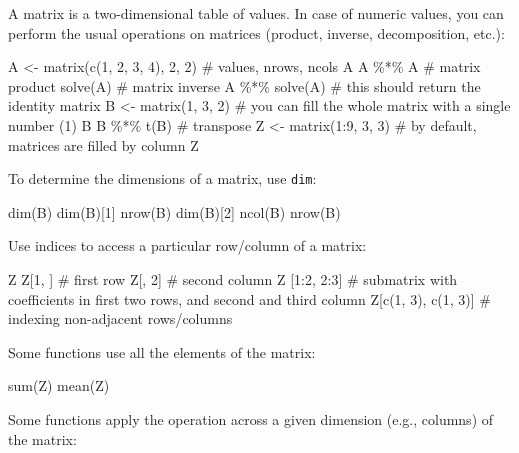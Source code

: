 \documentclass[
  letterpaper,
  DIV=11,
  numbers=noendperiod]{scrreprt}
\newenvironment{Shaded}{\begin{snugshade}}{\end{snugshade}}
\newcommand{\NormalTok}[1]{\textcolor[rgb]{0.00,0.23,0.31}{#1}}
\begin{document}
A matrix is a two-dimensional table of values. In case of numeric
values, you can perform the usual operations on matrices (product,
inverse, decomposition, etc.):

\begin{Shaded}
\begin{Highlighting}[]
\NormalTok{A \textless{}{-} matrix(c(1, 2, 3, 4), 2, 2) \# values, nrows, ncols}
\NormalTok{A }
\NormalTok{A \%*\% A \# matrix product}
\NormalTok{solve(A) \# matrix inverse}
\NormalTok{A \%*\% solve(A) \# this should return the identity matrix}
\NormalTok{B \textless{}{-} matrix(1, 3, 2) \# you can fill the whole matrix with a single number (1)}
\NormalTok{B}
\NormalTok{B \%*\% t(B) \# transpose}
\NormalTok{Z \textless{}{-} matrix(1:9, 3, 3) \# by default, matrices are filled by column}
\NormalTok{Z}
\end{Highlighting}
\end{Shaded}

To determine the dimensions of a matrix, use \texttt{dim}:

\begin{Shaded}
\begin{Highlighting}[]
\NormalTok{dim(B)}
\NormalTok{dim(B)[1]}
\NormalTok{nrow(B) }
\NormalTok{dim(B)[2]}
\NormalTok{ncol(B)}
\NormalTok{nrow(B)}
\end{Highlighting}
\end{Shaded}

Use indices to access a particular row/column of a matrix:

\begin{Shaded}
\begin{Highlighting}[]
\NormalTok{Z}
\NormalTok{Z[1, ] \# first row}
\NormalTok{Z[, 2] \# second column}
\NormalTok{Z [1:2, 2:3] \# submatrix with coefficients in first two rows, and second and third column}
\NormalTok{Z[c(1, 3), c(1, 3)] \# indexing non{-}adjacent rows/columns}
\end{Highlighting}
\end{Shaded}

Some functions use all the elements of the matrix:

\begin{Shaded}
\begin{Highlighting}[]
\NormalTok{sum(Z)}
\NormalTok{mean(Z)}
\end{Highlighting}
\end{Shaded}

Some functions apply the operation across a given dimension (e.g.,
columns) of the matrix:
\end{document}
